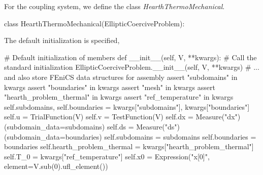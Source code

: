 For the coupling system, we define the class \emph{HearthThermoMechanical}.
\begin{python}
class HearthThermoMechanical(EllipticCoerciveProblem):
\end{python}

The default initialization is specified,
\begin{python}
	# Default initialization of members
	def __init__(self, V, **kwargs):
		# Call the standard initialization
		EllipticCoerciveProblem.__init__(self, V, **kwargs)
		# ... and also store FEniCS data structures for assembly
		assert "subdomains" in kwargs
		assert "boundaries" in kwargs
		assert "mesh" in kwargs
		assert "hearth_problem_thermal" in kwargs
		assert "ref_temperature" in kwargs
		self.subdomains, self.boundaries = kwargs["subdomains"], kwargs["boundaries"]
		self.u = TrialFunction(V)
		self.v = TestFunction(V)
		self.dx = Measure("dx")(subdomain_data=subdomains)
		self.ds = Measure("ds")(subdomain_data=boundaries)
		self.subdomains = subdomains
		self.boundaries = boundaries
		self.hearth_problem_thermal = kwargs["hearth_problem_thermal"]
		self.T_0 = kwargs["ref_temperature"]
		self.x0 = Expression("x[0]", element=V.sub(0).ufl_element())
\end{python}

